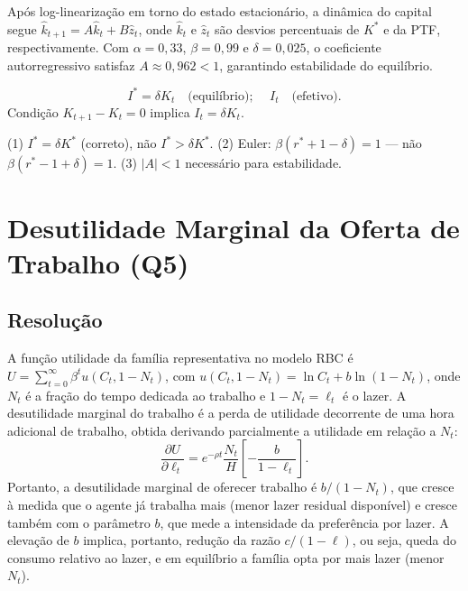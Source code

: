 \documentclass[12pt, a4paper]{article}
\begin{document}
Após log-linearização em torno do estado estacionário, a dinâmica do capital segue $\hat{k}_{t+1} = A\hat{k}_t + B\hat{z}_t$, onde $\hat{k}_t$ e $\hat{z}_t$ são desvios percentuais de $K^*$ e da PTF, respectivamente. Com $\alpha=0{,}33$, $\beta=0{,}99$ e $\delta=0{,}025$, o coeficiente autorregressivo satisfaz $A \approx 0{,}962 < 1$, garantindo estabilidade do equilíbrio.

\begin{resultbox}[title={Investimento de Equilíbrio (Q4)}]
\[
I^* = \delta K_t \quad \text{(equilíbrio); } \quad I_t \quad \text{(efetivo).}
\]
Condição $K_{t+1} - K_t = 0$ implica $I_t = \delta K_t$.
\end{resultbox}

\begin{provabox}[title={Q4 --- Erros Frequentes}]
(1) $I^* = \delta K^*$ (correto), não $I^* > \delta K^*$. (2) Euler: $\beta(r^*+1-\delta)=1$ --- não $\beta(r^*-1+\delta)=1$. (3) $|A|<1$ necessário para estabilidade.
\end{provabox}

\section{Desutilidade Marginal da Oferta de Trabalho (Q5)}

\subsection*{Resolução}

A função utilidade da família representativa no modelo RBC é $U = \sum_{t=0}^\infty \beta^t u(C_t, 1-N_t)$, com $u(C_t, 1-N_t) = \ln C_t + b\ln(1-N_t)$, onde $N_t$ é a fração do tempo dedicada ao trabalho e $1-N_t = \ell_t$ é o lazer. A desutilidade marginal do trabalho é a perda de utilidade decorrente de uma hora adicional de trabalho, obtida derivando parcialmente a utilidade em relação a $N_t$:
\[
\frac{\partial U}{\partial \ell_t} = e^{-\rho t}\frac{N_t}{H}\left[-\frac{b}{1-\ell_t}\right].
\]
Portanto, a desutilidade marginal de oferecer trabalho é $b/(1-N_t)$, que cresce à medida que o agente já trabalha mais (menor lazer residual disponível) e cresce também com o parâmetro $b$, que mede a intensidade da preferência por lazer. A elevação de $b$ implica, portanto, redução da razão $c/(1-\ell)$, ou seja, queda do consumo relativo ao lazer, e em equilíbrio a família opta por mais lazer (menor $N_t$).
\end{document}

